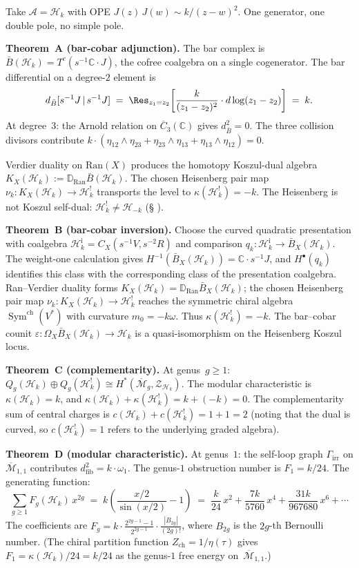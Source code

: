 \documentclass[11pt]{report}
\makeatletter
\theoremstyle{definition}
\theoremstyle{remark}
\providecommand{\cA}{\mathcal{A}}
\providecommand{\cH}{\mathcal{H}}
\providecommand{\cM}{\mathcal{M}}
\providecommand{\cZ}{\mathcal{Z}}
\providecommand{\barB}{\bar{B}}
\providecommand{\Ran}{\mathrm{Ran}}
\providecommand{\FM}{\overline{C}}
\providecommand{\C}{\mathbb{C}}
\numberwithin{equation}{section}
\let\svy@oldref\ref
\renewcommand{\ref}[1]{%
 \@ifundefined{r@#1}{\textit{full monograph}}{\svy@oldref{#1}}%
}
\makeatother
\begin{document}
Take $\cA = \cH_k$ with OPE
$J(z)\,J(w) \sim k/(z-w)^2$. One generator, one double pole, no
simple pole.

\smallskip
\noindent\textbf{Theorem~A (bar-cobar adjunction).}\enspace
The bar complex is $\barB(\cH_k) = T^c(s^{-1}\C\cdot J)$, the
cofree coalgebra on a single cogenerator. The bar differential on
a degree-$2$ element is
\[
d_{\barB}[s^{-1}J \,|\, s^{-1}J]
\;=\;
\Res_{z_1 = z_2}\!\left[
 \frac{k}{(z_1 - z_2)^2}\cdot d\log(z_1-z_2)
\right]
\;=\; k.
\]
At degree~$3$: the Arnold relation on $\FM_3(\C)$ gives
$d_{\barB}^2 = 0$. The three collision divisors contribute
$k \cdot (\eta_{12}\wedge\eta_{23} + \eta_{23}\wedge\eta_{13}
+ \eta_{13}\wedge\eta_{12}) = 0$.

Verdier duality on $\Ran(X)$ produces the homotopy Koszul-dual
algebra $K_X(\cH_k):=\mathbb{D}_{\Ran}\barB(\cH_k)$.  The chosen
Heisenberg pair map $\nu_k\colon K_X(\cH_k)\to\cH_k^!$ transports the
level to $\kappa(\cH_k^!)=-k$.
The Heisenberg is not Koszul self-dual:
$\cH_k^! \neq \cH_{-k}$
(\S\ref{sec:frame-koszul-dual}).

\smallskip
\noindent\textbf{Theorem~B (bar-cobar inversion).}\enspace
Choose the curved quadratic presentation with coalgebra
$\cH_k^{\mathrm i}=C_X(s^{-1}V,s^{-2}R)$ and comparison
$q_k\colon\cH_k^{\mathrm i}\to\barB_X(\cH_k)$.  The weight-one
calculation gives
$H^{-1}(\barB_X(\cH_k))=\C\cdot s^{-1}J$, and
$H^\bullet(q_k)$ identifies this class with the corresponding class
of the presentation coalgebra.  Ran--Verdier duality forms
$K_X(\cH_k)=\mathbb D_{\Ran}\barB_X(\cH_k)$; the chosen Heisenberg
pair map
$\nu_k\colon K_X(\cH_k)\to\cH_k^!$ reaches the symmetric chiral
algebra $\operatorname{Sym}^{\mathrm{ch}}(V^*)$ with curvature
$m_0=-k\omega$.  Thus $\kappa(\cH_k^!)=-k$.  The bar--cobar counit
$\varepsilon\colon\Omega_X\barB_X(\cH_k)\to\cH_k$ is a
quasi-isomorphism on the Heisenberg Koszul locus.

\smallskip
\noindent\textbf{Theorem~C (complementarity).}\enspace
At genus~$g \ge 1$:
$Q_g(\cH_k) \oplus Q_g(\cH_k^!) \cong
H^*(\overline{\cM}_g, \cZ_{\cH_k})$.
The modular characteristic is $\kappa(\cH_k) = k$, and
$\kappa(\cH_k) + \kappa(\cH_k^!) = k + (-k) = 0$. The
complementarity sum of central charges is
$c(\cH_k) + c(\cH_k^!) = 1 + 1 = 2$
(noting that the dual is curved, so $c(\cH_k^!)=1$ refers to
the underlying graded algebra).

\smallskip
\noindent\textbf{Theorem~D (modular characteristic).}\enspace
At genus~$1$: the self-loop graph $\Gamma_{\mathrm{irr}}$ on
$\overline{\cM}_{1,1}$ contributes
$d_{\mathrm{fib}}^2 = k \cdot \omega_1$. The genus-$1$
obstruction number is $F_1 = k/24$. The generating function:
\[
\sum_{g \ge 1} F_g(\cH_k)\,x^{2g}
\;=\;
k\!\left(\frac{x/2}{\sin(x/2)} - 1\right)
\;=\;
\frac{k}{24}\,x^2
+ \frac{7k}{5760}\,x^4
+ \frac{31k}{967680}\,x^6
+ \cdots
\]
The coefficients are
$F_g = k \cdot \frac{2^{2g-1}-1}{2^{2g-1}} \cdot
\frac{|B_{2g}|}{(2g)!}$,
where $B_{2g}$ is the $2g$-th Bernoulli number.
(The chiral partition function
$Z_{\mathrm{ch}} = 1/\eta(\tau)$ gives
$F_1 = \kappa(\cH_k)/24 = k/24$
as the genus-$1$ free energy on~$\overline{\cM}_{1,1}$.)
\end{document}
